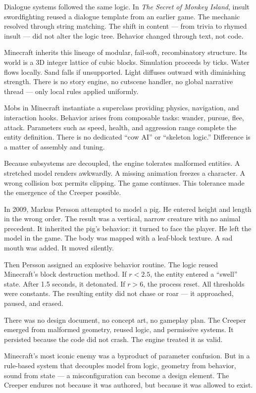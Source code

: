 Dialogue systems followed the same logic. In \emph{The Secret of Monkey Island}, insult swordfighting reused a dialogue template from an earlier game. The mechanic resolved through string matching. The shift in content — from trivia to rhymed insult — did not alter the logic tree. Behavior changed through text, not code.

Minecraft inherits this lineage of modular, fail-soft, recombinatory structure. Its world is a 3D integer lattice of cubic blocks. Simulation proceeds by ticks. Water flows locally. Sand falls if unsupported. Light diffuses outward with diminishing strength. There is no story engine, no cutscene handler, no global narrative thread — only local rules applied uniformly.

Mobs in Minecraft instantiate a superclass providing physics, navigation, and interaction hooks. Behavior arises from composable tasks: wander, pursue, flee, attack. Parameters such as speed, health, and aggression range complete the entity definition. There is no dedicated “cow AI” or “skeleton logic.” Difference is a matter of assembly and tuning.

Because subsystems are decoupled, the engine tolerates malformed entities. A stretched model renders awkwardly. A missing animation freezes a character. A wrong collision box permits clipping. The game continues. This tolerance made the emergence of the Creeper possible.

In 2009, Markus Persson attempted to model a pig. He entered height and length in the wrong order. The result was a vertical, narrow creature with no animal precedent. It inherited the pig’s behavior: it turned to face the player. He left the model in the game. The body was mapped with a leaf-block texture. A sad mouth was added. It moved silently.

Then Persson assigned an explosive behavior routine. The logic reused Minecraft’s block destruction method. If $r < 2.5$, the entity entered a “swell” state. After 1.5 seconds, it detonated. If $r > 6$, the process reset. All thresholds were constants. The resulting entity did not chase or roar — it approached, paused, and erased.

There was no design document, no concept art, no gameplay plan. The Creeper emerged from malformed geometry, reused logic, and permissive systems. It persisted because the code did not crash. The engine treated it as valid.

Minecraft’s most iconic enemy was a byproduct of parameter confusion. But in a rule-based system that decouples model from logic, geometry from behavior, sound from state — a misconfiguration can become a design element. The Creeper endures not because it was authored, but because it was allowed to exist.
